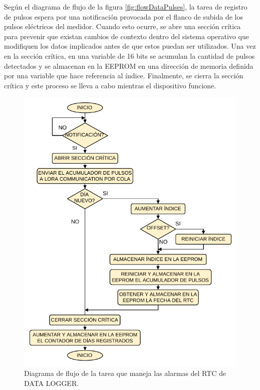 Según el diagrama de flujo de la figura \ref{fig:flowDataPulses}, la tarea de registro de pulsos espera por una notificación provocada por el flanco de subida de los pulsos eléctricos del medidor. Cuando esto ocurre, se abre una sección crítica para prevenir que existan cambios de contexto dentro del sistema operativo que modifiquen los datos implicados antes de que estos puedan ser utilizados. Una vez en la sección crítica, en una variable de 16 bits se acumulan la cantidad de pulsos detectados y se almacenan en la EEPROM en una dirección de memoria definida por una variable que hace referencia al índice. Finalmente, se cierra la sección crítica y este proceso se lleva a cabo mientras el dispositivo funcione.

\begin{figure}[h]
	\centering
	\includegraphics[scale=1]{./Figures/data_logger_alarm.pdf}
	\caption{Diagrama de flujo de la tarea que maneja las alarmas del RTC de DATA LOGGER.}
		\label{fig:flowDataAlarm}
\end{figure}

